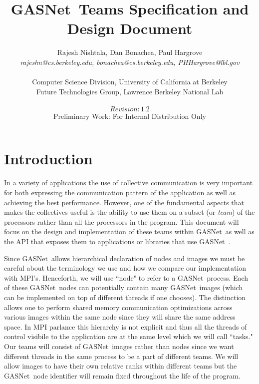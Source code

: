 \documentclass[times,10pt]{article}
\begin{document}
\newcommand{\gasnet}[0]{GASNet\ }





\title{\gasnet Teams Specification and Design Document}
\author{Rajesh Nishtala, Dan Bonachea, Paul Hargrove\\
    \emph{rajeshn@cs.berkeley.edu, bonachea@cs.berkeley.edu, PHHargrove@lbl.gov} \\\\
    Computer Science Division, University of California at Berkeley \\ 
    Future Technologies Group, Lawrence Berkeley National Lab\\ \\
    $Revision: 1.2 $ \\
    Preliminary Work: For Internal Distribution Only}
\maketitle


\section{Introduction}
In a variety of applications the use of collective communication is very
important for both expressing the communication pattern of the application as
well as achieving the best performance. However, one of the fundamental aspects
that makes the collectives useful is the ability to use them on a subset (or
\textit{team}) of the processors rather than all the processors in the program.
This document will focus on the design and implementation of these teams within
\gasnet as well as the API that exposes them to applications or libraries that
use \gasnet. 

Since \gasnet allows hierarchical declaration of nodes and images we must be
careful about the terminology we use and how we compare our implementation with
MPI's. Henceforth, we will use ``node" to refer to a \gasnet process. Each of
these \gasnet nodes can potentially contain many  \gasnet images (which can be
implemented on top of different threads if one chooses). The distinction allows
one to perform shared memory communication optimizations across various images
within the same node since they will share the same address space. In MPI
parlance this hierarchy is not explicit and thus all the threads of control
visibile to the application are at the same level which we will call ``tasks."
Our teams will consist of \gasnet images rather than nodes since we want
different threads in the same process to be a part of different teams. We will
allow images to have their own relative ranks within different teams but the
\gasnet node identifier will remain fixed throughout the life of the program. 
\end{document}
